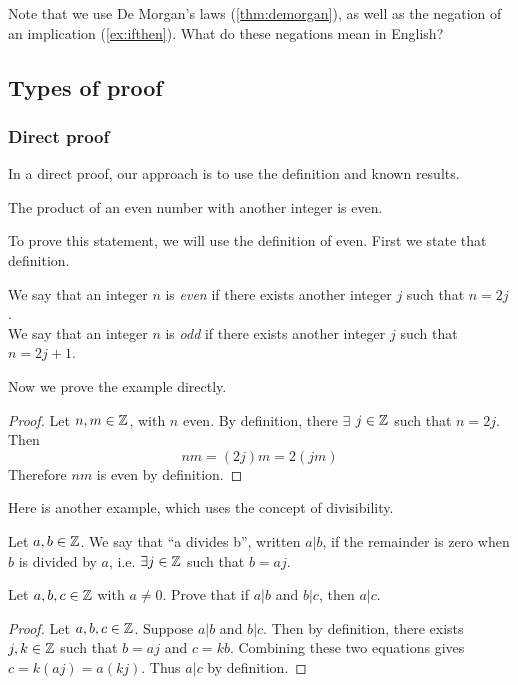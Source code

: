 \documentclass{article}
\begin{document}
\vspace{1em}

Note that we use De Morgan's laws (\cref{thm:demorgan}), as well as the negation of an implication (\cref{ex:ifthen}). What do these negations mean in English?


\subsection{Types of proof}

\subsubsection{Direct proof}

In a direct proof, our approach is to use the definition and known results.

\begin{example}
The product of an even number with another integer is even.
\end{example}

To prove this statement, we will use the definition of even. First we state that definition.

\begin{definition}
We say that an integer $n$ is \emph{even} if there exists another integer $j$ such that $n=2j$. \\
We say that an integer $n$ is \emph{odd} if there exists another integer $j$ such that $n=2j+1$.
\end{definition}

Now we prove the example directly.

\begin{proof}
Let $n, m \in {\mathbb{Z}}$, with $n$ even. By definition, there $\exists$ $j \in {\mathbb{Z}}$ such that $n = 2j$. Then 
$$ n m  =  (2 j) m = 2 (j m)$$
Therefore $n m$ is even by definition. 
\end{proof}

Here is another example, which uses the concept of divisibility.

\begin{definition}
Let $a,b \in {\mathbb{Z}}$. We say that ``a divides b'', written $a | b$, if the remainder is zero when $b$ is divided by $a$, i.e. $\exists j \in {\mathbb{Z}}$ such that $b = a j$.
\end{definition}


\begin{example}
Let $a,b,c \in {\mathbb{Z}}$ with $a \neq 0$. Prove that if $a | b$ and $b | c$, then $a | c$.
\end{example}
\begin{proof}
Let $a,b,c \in {\mathbb{Z}}$. Suppose $a | b$ and $b | c$. Then by definition, there exists $j,k \in {\mathbb{Z}}$ such that $b = aj$ and $c = kb$. Combining these two equations gives $c = k (aj) = a (kj)$. Thus $a | c$ by definition.
\end{proof}
\end{document}
